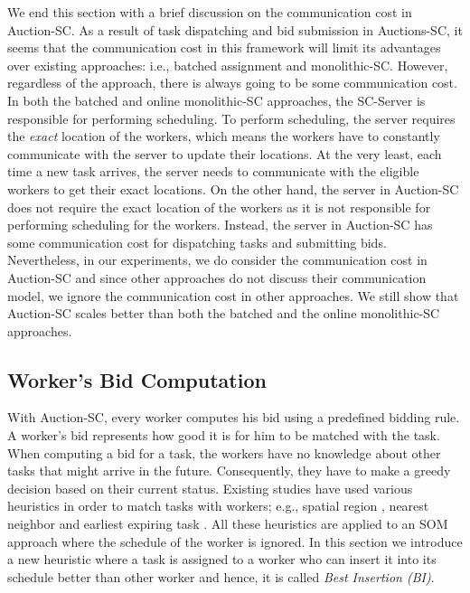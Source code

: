 We end this section with a brief discussion on the communication cost in Auction-SC. As a result of task dispatching and bid submission in Auctions-SC, it seems that the communication cost in this framework will limit its advantages over existing approaches: i.e., batched assignment and monolithic-SC. However, regardless of the approach, there is always going to be some communication cost. In both the batched and online monolithic-SC approaches, the SC-Server is responsible for performing scheduling. To perform scheduling, the server requires the \textit{exact} location of the workers, which means the workers have to constantly communicate with the server to update their locations. At the very least, each time a new task arrives, the server needs to communicate with the eligible workers to get their exact locations. On the other hand, the server in Auction-SC does not require the exact location of the workers as it is not responsible for performing scheduling for the workers. Instead, the server in Auction-SC has some communication cost for dispatching tasks and submitting bids. Nevertheless, in our experiments, we do consider the communication cost in Auction-SC and since other approaches do not discuss their communication model, we ignore the communication cost in other approaches. We still show that Auction-SC scales better than both the batched and the online monolithic-SC approaches.

\vspace{-0.05in}
\subsection{Worker's Bid Computation}
\label{subsec:bidding}
\vspace{-0.025in}

With Auction-SC, every worker computes his bid using a predefined bidding rule. A worker's bid represents how good it is for him to be matched with the task. When computing a bid for a task, the workers have no knowledge about other tasks that might arrive in the future. Consequently, they have to make a greedy decision based on their current status. Existing studies have used various heuristics in order to match tasks with workers; e.g., spatial region \cite{Cheng16}, nearest neighbor \cite{Fonteles15,Kazemi12,Guo16} and earliest expiring task \cite{Fonteles15}. All these heuristics are applied to an SOM approach where the schedule of the worker is ignored. In this section we introduce a new heuristic where a task is assigned to a worker who can insert it into its schedule better than other worker and hence, it is called \emph{Best Insertion (BI)}.

